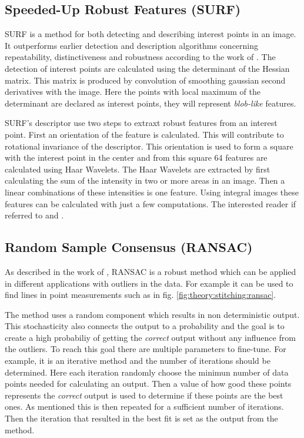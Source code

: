 \subsection{Speeded-Up Robust Features (SURF)}
SURF is a method for both detecting and describing interest points in an image.
It outperforms earlier detection and description algorithms concerning repeatability, distinctiveness and robustness according to the work of \cite{SURF}.
The detection of interest points are calculated using the determinant of the Hessian matrix.
This matrix is produced by convolution of smoothing gaussian second derivatives with the image.
Here the points with local maximum of the determinant are declared as interest points, they will represent {\it blob-like} features.

SURF's descriptor use two steps to extraxt robust features from an interest point.
First an orientation of the feature is calculated.
This will contribute to rotational invariance of the descriptor.
This orientation is used to form a square with the interest point in the center and from this square 64 features are calculated using Haar Wavelets.
The Haar Wavelets are extracted by first calculating the sum of the intensity in two or more areas in an image.
Then a linear combinations of these intensities is one feature.
Using integral images these features can be calculated with just a few computations.
The interested reader if referred to \cite{SURF} and \cite{Viola2004}.

\subsection{Random Sample Consensus (RANSAC)}
As described in the work of \cite{RANSAC}, RANSAC is a robust method which can be applied in different applications with outliers in the data.
For example it can be used to find lines in point measurements such as in fig. \ref{fig:theory:stitching:ransac}.

The method uses a random component which results in non deterministic output.
This stochasticity also connects the output to a probability and the goal is to create a high probabiliy of getting the {\it correct} output without any influence from the outliers.
To reach this goal there are multiple parameters to fine-tune.
For example, it is an iterative method and the number of iterations should be determined.
Here each iteration randomly choose the minimun number of data points needed for calculating an output.
Then a value of how good these points represents the {\it correct} output is used to determine if these points are the best ones.
As mentioned this is then repeated for a sufficient number of iterations.
Then the iteration that resulted in the best fit is set as the output from the method.

